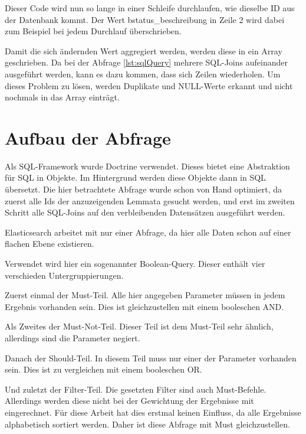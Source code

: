 Dieser Code wird nun so lange in einer Schleife durchlaufen, wie dieselbe ID aus der Datenbank kommt. Der Wert bstatus\_beschreibung in Zeile 2 wird dabei zum Beispiel bei jedem Durchlauf überschrieben. 

Damit die sich ändernden Wert aggregiert werden, werden diese in ein Array geschrieben. Da bei der Abfrage \ref{lst:sqlQuery} mehrere SQL-Joins aufeinander ausgeführt werden, kann es dazu kommen, dass sich Zeilen wiederholen. Um dieses Problem zu lösen, werden Duplikate und NULL-Werte erkannt und nicht nochmals in das Array einträgt.

\section{Aufbau der Abfrage}

Als SQL-Framework wurde Doctrine verwendet. Dieses bietet eine Abstraktion für SQL in Objekte. Im Hintergrund werden diese Objekte dann in SQL übersetzt. Die hier betrachtete Abfrage wurde schon von Hand optimiert, da zuerst alle Ids der anzuzeigenden Lemmata gesucht werden, und erst im zweiten Schritt alle SQL-Joins auf den verbleibenden Datensätzen ausgeführt werden.

Elasticsearch arbeitet mit nur einer Abfrage, da hier alle Daten schon auf einer flachen Ebene existieren.

Verwendet wird hier ein sogenannter Boolean-Query. Dieser enthält vier verschieden Untergruppierungen.

Zuerst einmal der Must-Teil. Alle hier angegeben Parameter müssen in jedem Ergebnis vorhanden sein. Dies ist gleichzustellen mit einem booleschen AND. 

Als Zweites der Must-Not-Teil. Dieser Teil ist dem Must-Teil sehr ähnlich, allerdings sind die Parameter negiert.

Danach der Should-Teil. In diesem Teil muss nur einer der Parameter vorhanden sein. Dies ist zu vergleichen mit einem booleschen OR. 

Und zuletzt der Filter-Teil. Die gesetzten Filter sind auch Must-Befehle. Allerdings werden diese nicht bei der Gewichtung der Ergebnisse mit eingerechnet. Für diese Arbeit hat dies erstmal keinen Einfluss, da alle Ergebnisse alphabetisch sortiert werden. Daher ist diese Abfrage mit Must gleichzustellen. \cite{ElasticsearchB.V..17.12.2019}


